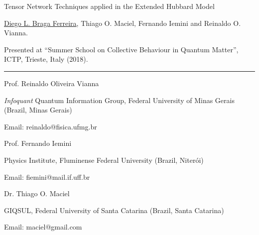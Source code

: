 \documentclass[a4paper,10pt]{article}
\newlength{\cvcolumngapwidth}
\newlength{\cvleftcolumnwidth}
\newlength{\cvrightcolumnwidth}
\newcommand{\cvsectionstyle}[1]{{\normalsize\cvsectionfont\textcolor{cvsectioncolor}{#1}}}
\newcommand{\cvtitlestyle}[1]{{\normalsize\cvtitlefont\textcolor{cvtitlecolor}{#1}}}
\newcommand{\cvdurationstyle}[1]{{\normalsize\cvdurationfont\textcolor{cvdurationcolor}{#1}}}
\newlength{\cvafteritemskipamount}
\newlength{\cvaftersectionskipamount}
\newlength{\cvaftertitleskipamount}
\newlength{\cvparskip}
\newcommand{\cvsection}[1]{
    \begin{minipage}[t]{\cvleftcolumnwidth}
        \raggedleft\cvsectionstyle{#1}
    \end{minipage}%
    \hspace{\cvcolumngapwidth}%
    \begin{minipage}[t]{\cvrightcolumnwidth}
        \textcolor{cvrulecolor}{\rule{\cvrightcolumnwidth}{0.5mm}}
    \end{minipage}
    \vspace{\cvaftersectionskipamount}}
\newcommand{\cvitem}[2]{
    \begin{minipage}[t]{\cvleftcolumnwidth}
        \raggedleft #1
    \end{minipage}%
    \hspace{\cvcolumngapwidth}%
    \begin{minipage}[t]{\cvrightcolumnwidth}
        \setlength{\parskip}{\cvparskip} #2
    \end{minipage}
    \vspace{\cvafteritemskipamount}}
\newcommand{\cvtitle}[1]{
    \cvtitlestyle{#1}
    \vspace{\cvaftertitleskipamount}
    \vspace{-\cvparskip}}
\begin{document}
\cvitem{\cvdurationstyle{Poster}}
    {\cvtitle{Tensor Network Techniques applied in the Extended
    Hubbard Model}
    
    \vspace{0.2cm}
    \underline{Diego L. Braga Ferreira}, Thiago O. Maciel, Fernando Iemini and Reinaldo O. Vianna.
    
    \vspace{0.2cm}
    Presented at ``Summer School on Collective Behaviour in Quantum Matter'', ICTP, Trieste, Italy (2018).}

\cvsection{References}

\cvitem{\cvdurationstyle{}}
    {\cvtitle{Prof. Reinaldo Oliveira Vianna}
    
    \emph{Infoquant} Quantum Information Group, Federal University of Minas Gerais (Brazil, Minas Gerais)
    
    \vspace{0.2cm}
    Email: reinaldo@fisica.ufmg.br}

\cvitem{\cvdurationstyle{}}
    {\cvtitle{Prof. Fernando Iemini}
    
    Physics Institute, Fluminense Federal University (Brazil, Niter\'oi)
    
    \vspace{0.2cm}
    Email: fiemini@mail.if.uff.br}

\cvitem{\cvdurationstyle{}}
    {\cvtitle{Dr. Thiago O. Maciel}
    
    GIQSUL, Federal University of Santa Catarina (Brazil, Santa Catarina)
    
    \vspace{0.2cm}
    Email: maciel@gmail.com}
\end{document}
